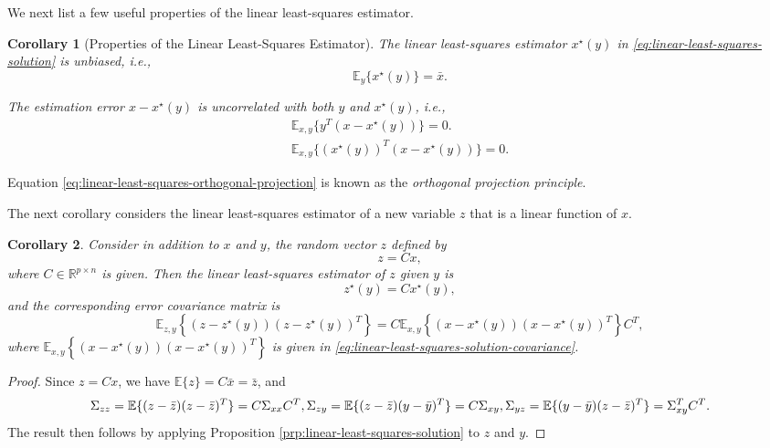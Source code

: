 \documentclass[
]{book}
\newtheorem{corollary}{Corollary}[chapter]
\theoremstyle{definition}
\theoremstyle{definition}
\theoremstyle{definition}
\theoremstyle{definition}
\theoremstyle{remark}
\begin{document}
We next list a few useful properties of the linear least-squares estimator.

\begin{corollary}[Properties of the Linear Least-Squares Estimator]
\protect\hypertarget{cor:properties-linear-least-squares-estimator}{}\label{cor:properties-linear-least-squares-estimator}The linear least-squares estimator \(x^\star(y)\) in \eqref{eq:linear-least-squares-solution} is unbiased, i.e.,
\[
\mathbb{E}_y \{ x^\star(y) \} = \bar{x}.
\]

The estimation error \(x - x^\star(y)\) is uncorrelated with both \(y\) and \(x^\star(y)\), i.e.,
\begin{equation}
\begin{split}
\mathbb{E}_{x,y} \{ y^T (x - x^\star(y)) \} = 0. \\
\mathbb{E}_{x,y} \{ (x^\star(y))^T (x - x^\star(y)) \} = 0.
\end{split}
\label{eq:linear-least-squares-orthogonal-projection}
\end{equation}
\end{corollary}

Equation \eqref{eq:linear-least-squares-orthogonal-projection} is known as the \emph{orthogonal projection principle}.

The next corollary considers the linear least-squares estimator of a new variable \(z\) that is a linear function of \(x\).

\begin{corollary}
\protect\hypertarget{cor:linear-least-squares-z}{}\label{cor:linear-least-squares-z}Consider in addition to \(x\) and \(y\), the random vector \(z\) defined by
\[
z = Cx,
\]
where \(C \in \mathbb{R}^{p \times n}\) is given. Then the linear least-squares estimator of \(z\) given \(y\) is
\[
z^\star(y) = C x^\star(y),
\]
and the corresponding error covariance matrix is
\[
\mathbb{E}_{z,y}\left\{ (z - z^\star(y))(z - z^\star(y))^T \right\} = C \mathbb{E}_{x,y} \left\{ (x - x^\star(y))(x - x^\star(y))^T \right\} C^T,
\]
where \(\mathbb{E}_{x,y} \left\{ (x - x^\star(y))(x - x^\star(y))^T \right\}\) is given in \eqref{eq:linear-least-squares-solution-covariance}.
\end{corollary}

\begin{proof}
Since \(z = Cx\), we have \(\mathbb{E} \{ z \} = C \bar{x} = \bar{z}\), and
\[
\Sigma_{zz} = \mathbb{E} \{ (z - \bar{z})(z - \bar{z})^T \} = C \Sigma_{xx} C^T, \\
\Sigma_{zy} = \mathbb{E} \{ (z - \bar{z})(y - \bar{y})^T \} = C \Sigma_{xy}, \\
\Sigma_{yz} = \mathbb{E} \{ (y - \bar{y}) (z - \bar{z})^T \} = \Sigma^T_{xy} C^T.
\]
The result then follows by applying Proposition \ref{prp:linear-least-squares-solution} to \(z\) and \(y\).
\end{proof}
\end{document}
